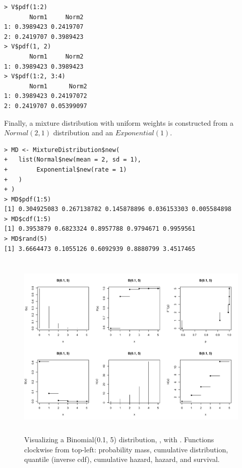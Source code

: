 \begin{verbatim}
> V$pdf(1:2)
       Norm1     Norm2
1: 0.3989423 0.2419707
2: 0.2419707 0.3989423
> V$pdf(1, 2)
       Norm1     Norm2
1: 0.3989423 0.3989423
> V$pdf(1:2, 3:4)
       Norm1      Norm2
1: 0.3989423 0.24197072
2: 0.2419707 0.05399097
\end{verbatim}

Finally, a mixture distribution with uniform weights is constructed from a $Normal(2, 1)$ distribution and an $Exponential(1)$.

\begin{verbatim}
> MD <- MixtureDistribution$new(
+   list(Normal$new(mean = 2, sd = 1),
+        Exponential$new(rate = 1)
+   )
+ )
> MD$pdf(1:5)
[1] 0.304925083 0.267138782 0.145878896 0.036153303 0.005584898
> MD$cdf(1:5)
[1] 0.3953879 0.6823324 0.8957788 0.9794671 0.9959561
> MD$rand(5)
[1] 3.6664473 0.1055126 0.6092939 0.8880799 3.4517465
\end{verbatim}

\begin{figure}[h]
\centering
\includegraphics[width = 14cm, height = 9cm]{images/Fig_2}
\caption{Visualizing a Binomial(0.1, 5) distribution, , with . Functions clockwise from top-left: probability mass, cumulative distribution, quantile (inverse cdf), cumulative hazard, hazard, and survival.}
\label{fig:binom}
\end{figure}

